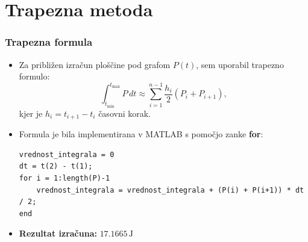 \documentclass[10pt]{beamer}
\begin{document}
\section{Trapezna metoda}
\begin{frame}[fragile]
\frametitle{Trapezna formula}
\begin{itemize}
    \item Za približen izračun ploščine pod grafom \( P(t) \), sem uporabil trapezno formulo:
    \[
    \int_{t_{\text{min}}}^{t_{\text{max}}} P \, dt \approx \sum_{i=1}^{n-1} \frac{h_i}{2} (P_i + P_{i+1}),
    \]
    kjer je \( h_i = t_{i+1} - t_i \) časovni korak.
    
    \item Formula je bila implementirana v MATLAB s pomočjo zanke \textbf{for}:
\begin{verbatim}
vrednost_integrala = 0
dt = t(2) - t(1); 
for i = 1:length(P)-1
    vrednost_integrala = vrednost_integrala + (P(i) + P(i+1)) * dt / 2;
end
\end{verbatim}
    \item \textbf{Rezultat izračuna:} \( 17.1665 \, \text{J} \)
\end{itemize}
\end{frame}
\end{document}
